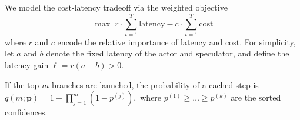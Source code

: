 We model the cost-latency tradeoff via the weighted objective
\begin{equation*}
    \max \; r\cdot\sum_{t=1}^T\mathrm{latency} - c\cdot\sum_{t=1}^T\mathrm{cost}
\end{equation*}
where $r$ and $c$ encode the relative importance of latency and cost. For simplicity, let $a$ and $b$ denote the fixed latency of the actor and speculator, and define the latency gain $\ell = r(a-b) > 0$.


If the top $m$ branches are launched, the probability of a cached step is
$
q(m;\mathbf p)
=
1 - \prod_{j=1}^{m}(1-p^{(j)}),
$
where $p^{(1)} \ge \dots \ge p^{(k)}$ are the sorted confidences.



